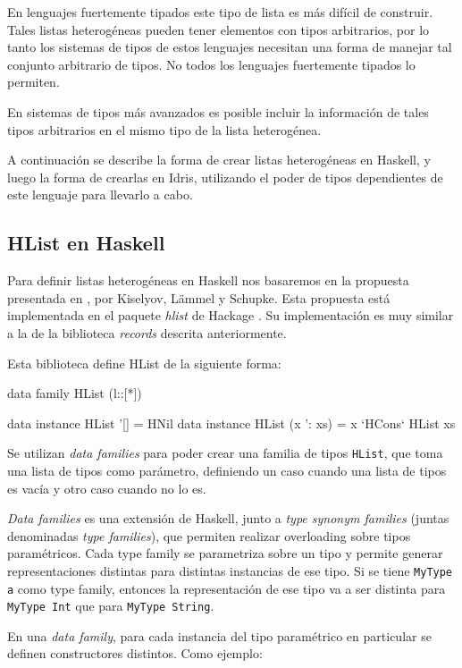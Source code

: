 En lenguajes fuertemente tipados este tipo de lista es más difícil de construir. Tales listas heterogéneas pueden tener elementos con tipos arbitrarios, por lo tanto los sistemas de tipos de estos lenguajes necesitan una forma de manejar tal conjunto arbitrario de tipos. No todos los lenguajes fuertemente tipados lo permiten.

En sistemas de tipos más avanzados es posible incluir la información de tales tipos arbitrarios en el mismo tipo de la lista heterogénea.

A continuación se describe la forma de crear listas heterogéneas en Haskell, y luego la forma de crearlas en Idris, utilizando el poder de tipos dependientes de este lenguaje para llevarlo a cabo.

\subsection{HList en Haskell}

Para definir listas heterogéneas en Haskell nos basaremos en la propuesta presentada en \cite{Kiselyov:2004:STH:1017472.1017488}, por Kiselyov, L\"{a}mmel y Schupke. Esta propuesta está implementada en el paquete \textit{hlist} de Hackage \cite{HListHackage}. Su implementación es muy similar a la de la biblioteca \textit{records} descrita anteriormente.

Esta biblioteca define HList de la siguiente forma:

\begin{code}
data family HList (l::[*])

data instance HList '[] = HNil
data instance HList (x ': xs) = x `HCons` HList xs
\end{code}

Se utilizan \textit{data families} para poder crear una familia de tipos \texttt{HList}, que toma una lista de tipos como parámetro, definiendo un caso cuando una lista de tipos es vacía y otro caso cuando no lo es.

\textit{Data families} es una extensión de Haskell, junto a \textit{type synonym families} (juntas denominadas \textit{type families}), que permiten realizar overloading sobre tipos paramétricos. Cada type family se parametriza sobre un tipo y permite generar representaciones distintas para distintas instancias de ese tipo. Si se tiene \texttt{MyType a} como type family, entonces la representación de ese tipo va a ser distinta para \texttt{MyType Int} que para \texttt{MyType String}.

En una \textit{data family}, para cada instancia del tipo paramétrico en particular se definen constructores distintos. Como ejemplo:

